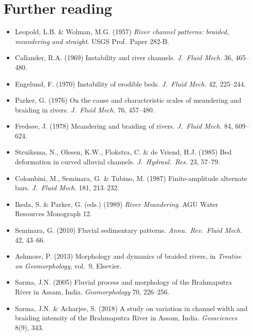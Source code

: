 \documentclass[11pt,a4paper]{report}
\theoremstyle{definition}
\theoremstyle{plain}
\theoremstyle{remark}
\begin{document}
\section{Further reading}
\begin{itemize}[nosep]
\item Leopold, L.B. \& Wolman, M.G. (1957) \emph{River channel patterns: braided, meandering and straight}. USGS Prof.\ Paper 282-B.
\item Callander, R.A. (1969) Instability and river channels. \emph{J.\ Fluid Mech.} 36, 465--480.
\item Engelund, F. (1970) Instability of erodible beds. \emph{J.\ Fluid Mech.} 42, 225--244.
\item Parker, G. (1976) On the cause and characteristic scales of meandering and braiding in rivers. \emph{J.\ Fluid Mech.} 76, 457--480.
\item Fredsøe, J. (1978) Meandering and braiding of rivers. \emph{J.\ Fluid Mech.} 84, 609--624.
\item Struiksma, N., Olesen, K.W., Flokstra, C. \& de Vriend, H.J. (1985) Bed deformation in curved alluvial channels. \emph{J.\ Hydraul.\ Res.} 23, 57--79.
\item Colombini, M., Seminara, G. \& Tubino, M. (1987) Finite-amplitude alternate bars. \emph{J.\ Fluid Mech.} 181, 213--232.
\item Ikeda, S. \& Parker, G. (eds.) (1989) \emph{River Meandering}. AGU Water Resources Monograph 12.
\item Seminara, G. (2010) Fluvial sedimentary patterns. \emph{Annu.\ Rev.\ Fluid Mech.} 42, 43--66.
\item Ashmore, P. (2013) Morphology and dynamics of braided rivers, in \emph{Treatise on Geomorphology}, vol.\ 9, Elsevier.
\item Sarma, J.N. (2005) Fluvial process and morphology of the Brahmaputra River in Assam, India. \emph{Geomorphology} 70, 226--256.
\item Sarma, J.N. \& Acharjee, S. (2018) A study on variation in channel width and braiding intensity of the Brahmaputra River in Assam, India. \emph{Geosciences} 8(9), 343.
\end{itemize}
\end{document}
